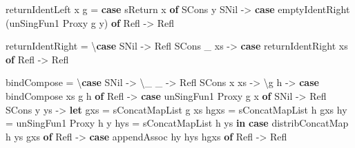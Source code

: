 \documentclass[]{article}
\newenvironment{Shaded}{\begin{snugshade}}{\end{snugshade}}
\newcommand{\DataTypeTok}[1]{\textcolor[rgb]{0.13,0.29,0.53}{#1}}
\newcommand{\FunctionTok}[1]{\textcolor[rgb]{0.00,0.00,0.00}{#1}}
\newcommand{\KeywordTok}[1]{\textcolor[rgb]{0.13,0.29,0.53}{\textbf{#1}}}
\newcommand{\NormalTok}[1]{#1}
\newcommand{\OtherTok}[1]{\textcolor[rgb]{0.56,0.35,0.01}{#1}}
\begin{document}
\begin{Shaded}
\begin{Highlighting}[]
\NormalTok{    returnIdentLeft x g }\FunctionTok{=} \KeywordTok{case}\NormalTok{ sReturn x }\KeywordTok{of}
      \DataTypeTok{SCons}\NormalTok{ y }\DataTypeTok{SNil} \OtherTok{->} \KeywordTok{case}\NormalTok{ emptyIdentRight (unSingFun1 }\DataTypeTok{Proxy}\NormalTok{ g y) }\KeywordTok{of}
        \DataTypeTok{Refl} \OtherTok{->} \DataTypeTok{Refl}

\NormalTok{    returnIdentRight }\FunctionTok{=}\NormalTok{ \textbackslash{}}\KeywordTok{case}
      \DataTypeTok{SNil}       \OtherTok{->} \DataTypeTok{Refl}
      \DataTypeTok{SCons}\NormalTok{ _ xs }\OtherTok{->} \KeywordTok{case}\NormalTok{ returnIdentRight xs }\KeywordTok{of}
        \DataTypeTok{Refl} \OtherTok{->} \DataTypeTok{Refl}

\NormalTok{    bindCompose }\FunctionTok{=}\NormalTok{ \textbackslash{}}\KeywordTok{case}
      \DataTypeTok{SNil}       \OtherTok{->}\NormalTok{ \textbackslash{}_ _ }\OtherTok{->} \DataTypeTok{Refl}
      \DataTypeTok{SCons}\NormalTok{ x xs }\OtherTok{->}\NormalTok{ \textbackslash{}g h }\OtherTok{->} \KeywordTok{case}\NormalTok{ bindCompose xs g h }\KeywordTok{of}
        \DataTypeTok{Refl} \OtherTok{->} \KeywordTok{case}\NormalTok{ unSingFun1 }\DataTypeTok{Proxy}\NormalTok{ g x }\KeywordTok{of}
          \DataTypeTok{SNil}       \OtherTok{->} \DataTypeTok{Refl}
          \DataTypeTok{SCons}\NormalTok{ y ys }\OtherTok{->}
            \KeywordTok{let}\NormalTok{ gxs  }\FunctionTok{=}\NormalTok{ sConcatMapList g xs}
\NormalTok{                hgxs }\FunctionTok{=}\NormalTok{ sConcatMapList h gxs}
\NormalTok{                hy   }\FunctionTok{=}\NormalTok{ unSingFun1 }\DataTypeTok{Proxy}\NormalTok{ h y}
\NormalTok{                hys  }\FunctionTok{=}\NormalTok{ sConcatMapList h ys}
            \KeywordTok{in}  \KeywordTok{case}\NormalTok{ distribConcatMap h ys gxs }\KeywordTok{of}
                  \DataTypeTok{Refl} \OtherTok{->} \KeywordTok{case}\NormalTok{ appendAssoc hy hys hgxs }\KeywordTok{of}
                    \DataTypeTok{Refl} \OtherTok{->} \DataTypeTok{Refl}


\end{Highlighting}
\end{Shaded}
\end{document}
